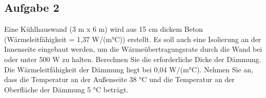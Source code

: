 \documentclass[a4paper,11pt]{article}
\newif\ifshowme
\begin{document}
\subsection*{Aufgabe 2}
Eine Kühlhauswand (3 m x 6 m) wird aus 15 cm dickem Beton (Wärmeleitfähigkeit = 1,37
W/(m°C)) erstellt. Es soll auch eine Isolierung an der Innenseite eingebaut werden, um
die Wärmeübertragungsrate durch die Wand bei oder unter 500 W zu halten. Berechnen
Sie die erforderliche Dicke der Dämmung. Die Wärmeleitfähigkeit der Dämmung liegt bei
0,04 W/(m°C). Nehmen Sie an, dass die Temperatur an der Außenseite 38 °C und die
Temperatur an der Oberfläche der Dämmung 5 °C beträgt.
\begin{marginfigure}[-3.5cm]
\centering
{}
\caption{Modell einer Kühlhauswand mit Dämmung}
\end{marginfigure}

\ifshowme%
\marginnote[]{\small Hier ist die Verwendung der richtigen Vorzeichen besonders wichtig. Hätten wir für die Temperatur einen negativen Wert raus, müssten wir auch einen negativen Vorfaktor vor dem Bruch benutzen. Ein falsches Vorzeichen würde tatsächlich auch eine andere Zahl im Ergebnis zur Folge haben.}[2cm]%
%
\antwort{
\begin{align*}
\dot{Q} &= \frac{A \cdot T_a - T_i}{\frac{d_2}{\lambda_2} + \frac{d_1}{\lambda_1}} \\
	d_2 &= \lambda_2 \cdot (\frac{A \cdot (T_a - T_i)}{\dot{Q}} - \frac{d_1}{\lambda_1}) \\
	d_2 &= 0,04~ \text{W/m°C} \cdot (\frac{18~\text{m}^2 \cdot ((38-5) \text{°C})}{500~\text{W}} - \frac{0,15~\text{m}}{1,37~ \text{W/m°C} }) \\
	d_2 &= 0,043~\text{m} \rightarrow 4,3~ \text{cm}
\end{align*}
}
\else
\fi
\end{document}
